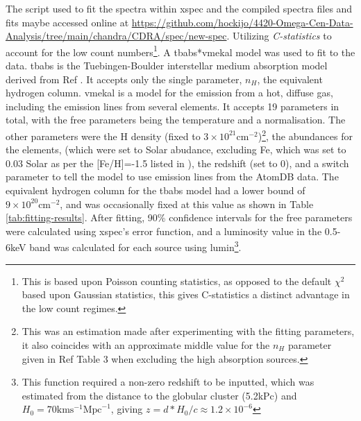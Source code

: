 \documentclass[aps,
                pra,  
                a4paper, 
                amsmath, 
                amssymb, 
                preprint,
                tightenlines,  
                amsfonts,
                nofootinbib,
                notitlepage
            ]{revtex4-2}
\begin{document}
The script used to fit the spectra within {\sc xspec} and the compiled spectra files and fits maybe accessed online at \url{https://github.com/hockijo/4420-Omega-Cen-Data-Analysis/tree/main/chandra/CDRA/spec/new-spec}. Utilizing {\it C-statistics}\cite{Cash1979} to account for the low count numbers\footnote{This is based upon Poisson counting statistics, as opposed to the default $\chi^2$ based upon Gaussian statistics, this gives C-statistics a distinct advantage in the low count regimes.}. A {\sc tbabs*vmekal} model was used to fit to the data. {\sc tbabs}\cite{Wilms2000} is the Tuebingen-Boulder interstellar medium absorption model derived from Ref \cite{Wilms2000}. It accepts only the single parameter, $n_H$, the equivalent hydrogen column. {\sc vmekal}\cite{Mewe1985,Mewe1986,Liedahl1995} is a model for the emission from a hot, diffuse gas, including the emission lines from several elements. It accepts 19 parameters in total, with the free parameters being the temperature and a normalisation. The other parameters were the H density (fixed to $3\times10^{21}\text{cm}^{-2}$)\footnote{This was an estimation made after experimenting with the fitting parameters, it also coincides with an approximate middle value for the $n_H$ parameter given in Ref \cite{Henleywillis2018} Table 3 when excluding the high absorption sources.}, the abundances for the elements, (which were set to Solar abudance, excluding Fe, which was set to 0.03 Solar as per the [Fe/H]=-1.5 listed in \cite{Henleywillis2018}), the redshift (set to 0), and a switch parameter to tell the model to use emission lines from the AtomDB data. The equivalent hydrogen column for the {\sc tbabs} model had a lower bound of $9\times10^{20}\text{cm}^{-2}$, and was occasionally fixed at this value as shown in Table \ref{tab:fitting-results}. After fitting, 90\% confidence intervals for the free parameters were calculated using {\sc xspec}'s {\sc error} function, and a luminosity value in the 0.5-6keV band was calculated for each source using {\sc lumin}\footnote{This function required a non-zero redshift to be inputted, which was estimated from the distance to the globular cluster (5.2kPc\cite{Henleywillis2018}) and $H_0=70\text{km}\text{s}^{-1}\text{Mpc}^{-1}$, giving $z=d*H_0/c\approx1.2\times10^{-6}$}.
\end{document}
